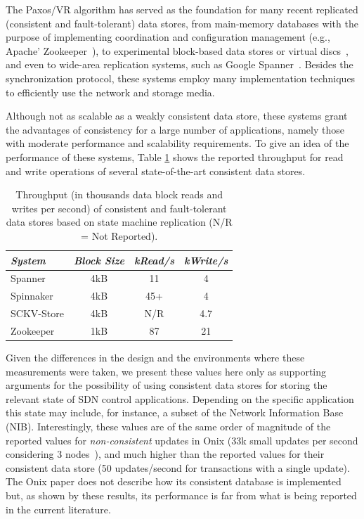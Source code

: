 \begin{itemize}
The Paxos/VR algorithm has served as the foundation for many recent replicated (consistent and fault-tolerant) data stores, from main-memory databases with the purpose of implementing coordination and configuration management (e.g., Apache'  Zookeeper~\cite{Hun10}), to experimental block-based data stores or virtual discs~\cite{Rao11,Bol11,Bes13}, and even to wide-area replication systems, such as Google Spanner~\cite{Corbett:2012uz}.
Besides the synchronization protocol, these systems employ many implementation techniques to efficiently use the network and storage media.

Although not as scalable as a weakly consistent data store, these systems grant the advantages of consistency for a large number of applications, namely those with moderate performance and scalability requirements. To give an idea of the performance of these systems, Table \ref{table:smr-results} shows the reported throughput for read and write operations of several state-of-the-art consistent data stores.

\begin{table}
  \center
    \begin{tabular}{ lccc}
    \hline
    \emph{System} & \emph{Block Size} & \emph{kRead/s} & \emph{kWrite/s} \\ \toprule
    Spanner \cite{Corbett:2012uz} & 4kB & 11 & 4 \\ 
    Spinnaker \cite{Rao11} & 4kB & 45+ & 4 \\  
    SCKV-Store \cite{Bes13} & 4kB & N/R & 4.7 \\ 
    Zookeeper \cite{Hun10} & 1kB & 87 & 21 \\ \bottomrule 
    \end{tabular}
  \caption[Performance of state machine replication systems]{Throughput (in thousands data block reads and writes per second) of consistent and fault-tolerant data stores based on state machine replication (N/R = Not Reported).}
  \label{table:smr-results}
\end{table}

Given the differences in the design and the environments where these measurements were taken, we present these values here only as supporting arguments for the possibility of using consistent data stores for storing the relevant state of SDN control applications.
Depending on the specific application this state may include, for instance, a subset of the Network Information Base (NIB).
Interestingly, these values are of the same order of magnitude of the reported values for \emph{non-consistent} updates in Onix (33k small updates per second considering 3 nodes~\cite{koponen2010}), and much higher than the reported values for their consistent data store (50 updates/second for transactions with a single update).
The Onix paper does not describe how its consistent database is implemented but, as shown by these results, its performance is far from what is being reported in the current literature.



\end{itemize}
